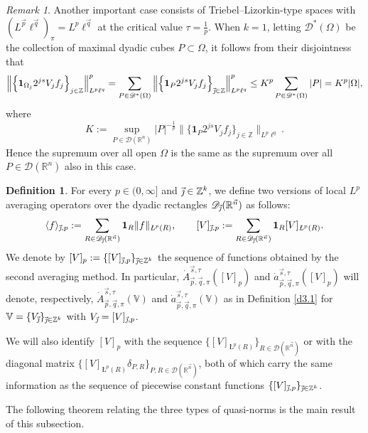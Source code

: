\documentclass[11pt, reqno]{amsart}
\theoremstyle{definition}
\newtheorem{definition}[theorem]{Definition}
\theoremstyle{remark}
\newtheorem{remark}[theorem]{Remark}
\numberwithin{equation}{section}
\newcommand{\D}{\mathscr D}
\newcommand{\R}{\mathbb R}
\newcommand{\V}{\mathbb V}
\newcommand{\Z}{\mathbb Z}
\newcommand{\vj}{\vec{\textit{\j}}}
\newcommand{\vn}{\vec n}
\newcommand{\vp}{\vec p}
\newcommand{\vq}{\vec q}
\newcommand{\vs}{\vec s}
\newcommand{\Atau}{\dot A^{\vs,\tau}_{\vp,\vq,\pi}}
\newcommand{\atau}{\dot a^{\vs,\tau}_{\vp,\vq,\pi}}
\newcommand{\one}{\mathbf{1}}
\newcommand{\aveL}{\textit{\L}}
\newcommand{\Ave}[3]{\langle#1\rangle_{#2,#3}}
\newcommand{\Red}[3]{[#1]_{#2,#3}}
\newcommand{\abs}[1]{|#1|}
\newcommand{\Norm}[2]{\|#1\|_{#2}}
\begin{document}
\begin{remark}
Another important case consists of Triebel--Lizorkin-type spaces with $(L^{\vp}\ell^{\vq})_\pi=L^p\ell^{\vq}$ at the critical value $\tau=\frac1p$. When $k=1$, letting $\mathscr D^*(\Omega)$ be the collection of maximal dyadic cubes $P\subset\Omega$, it follows from their disjointness that
\begin{equation*}
\Big\|\Big\{\one_{\Omega_{j}}2^{js}V_{j}f_{j}\Big\}_{j\in\Z}\Big\|_{L^p\ell^q}^p
=\sum_{P\in\mathscr D^*(\Omega)}
\Big\|\Big\{\one_{P}2^{js}V_{j}f_{j}\Big\}_{\vj\in\Z}\Big\|_{L^p\ell^q}^p
\leq K^p\sum_{P\in\mathscr D^*(\Omega)}\abs{P}
= K^p\abs{\Omega},
\end{equation*}
where
\begin{equation*}
K:=\sup_{P\in\mathscr D(\R^n)}\abs{P}^{-\frac1p}\Big\|\Big\{\one_{P}2^{js}V_{j}f_{j}\Big\}_{j\in\Z}\Big\|_{L^p\ell^q}.
\end{equation*}
Hence the supremum over all open $\Omega$ is the same as the supremum over all $P\in\mathscr D(\R^n)$ also in this case.
\end{remark}

\begin{definition}\label{ave}
For every $p\in(0,\infty]$ and $\vj\in\Z^k$,
we define two versions of local $L^p$ averaging operators over the dyadic rectangles $\D_{\vj}(\R^{\vn})$ as follows:
\begin{equation*}
\Ave{f}{\vj}{p}:=\sum_{R\in\D_{\vj}(\R^{\vn})}\one_R\Norm{f}{\aveL^p(R)},\qquad
\Red{V}{\vj}{p}:=\sum_{R\in\D_{\vj}(\R^{\vn})}\one_R[V]_{\aveL^p(R)}.
\end{equation*}
We denote by $[V]_p:=\{\Red{V}{\vj}{p}\}_{\vj\in\Z^k}$ the sequence of functions obtained by the second averaging method. In particular, $\Atau([V]_p)$ and $\atau([V]_p)$ will denote, respectively, $\Atau(\V)$ and $\atau(\V)$ as in Definition \ref{d3.1} for $\V=\{V_{\vj}\}_{\vj\in\Z^k}$ with $V_{\vj}=\Red{V}{\vj}{p}$.

We will also identify $[V]_p$ with the sequence $\{[V]_{\aveL^p(R)}\}_{R\in\D(\R^{\vn})}$ or with the diagonal matrix $\{[V]_{\aveL^p(R)}\delta_{P,R}\}_{P,R\in\D(\R^{\vn})}$, both of which carry the same information as the sequence of piecewise constant functions $\{\Red{V}{\vj}{p}\}_{\vj\in\Z^k}$.
\end{definition}

The following theorem relating the three types of quasi-norms is the main result of this subsection.
\end{document}
